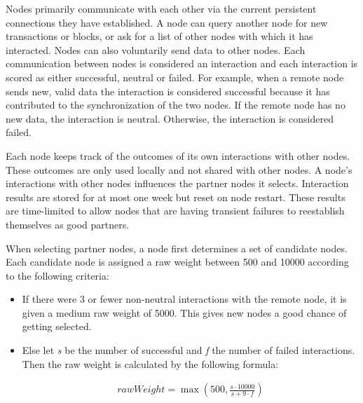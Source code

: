 Nodes primarily communicate with each other via the current persistent connections they have established.
A node can query another node for new transactions or blocks, or ask for a list of other nodes with which it has interacted.
Nodes can also voluntarily send data to other nodes.
Each communication between nodes is considered an interaction and each interaction is scored as either successful, neutral or failed.
For example, when a remote node sends new, valid data the interaction is considered successful because it has contributed to the synchronization of the two nodes.
If the remote node has no new data, the interaction is neutral.
Otherwise, the interaction is considered failed.

Each node keeps track of the outcomes of its own interactions with other nodes.
These outcomes are only used locally and not shared with other nodes.
A node's interactions with other nodes influences the partner nodes it selects.
Interaction results are stored for at most one week but reset on node restart.
These results are time-limited to allow nodes that are having transient failures to reestablish themselves as good partners.

When selecting partner nodes, a node first determines a set of candidate nodes.
Each candidate node is assigned a raw weight between 500 and 10000 according to the following criteria:

\begin{itemize}
\item If there were 3 or fewer non-neutral interactions with the remote node, it is given a medium raw weight of 5000.
This gives new nodes a good chance of getting selected.
\item Else let \textit{s} be the number of successful and \textit{f} the number of failed interactions.
Then the raw weight is calculated by the following formula:

\begin{figure}[t!]
\end{figure}

\begin{align*}
\mathit{rawWeight} = \max\left(500, \frac{s \cdot 10000}{s + 9 \cdot f}\right)
\end{align*}
\end{itemize}

